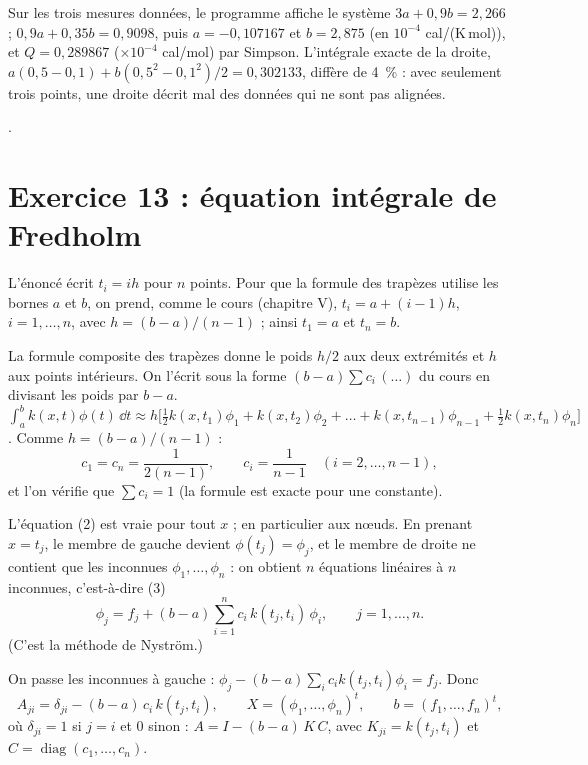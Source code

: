 \Verif Sur les trois mesures données, le programme affiche le système
$3a + 0{,}9b = 2{,}266$ ; $0{,}9a + 0{,}35b = 0{,}9098$, puis
$a = -0{,}107167$ et $b = 2{,}875$ (en $10^{-4}$ cal/(K\,mol)), et
$Q = 0{,}289867$ ($\times 10^{-4}$ cal/mol) par Simpson. L'intégrale exacte de la
droite, $a(0{,}5 - 0{,}1) + b(0{,}5^2 - 0{,}1^2)/2 = 0{,}302133$, diffère de 4~\% :
avec seulement trois points, une droite décrit mal des données qui ne sont pas
alignées.

\Refs {}.

\section{Exercice 13 : équation intégrale de Fredholm}

\Attention L'énoncé écrit $t_i = ih$ pour $n$ points. Pour que la formule des
trapèzes utilise les bornes $a$ et $b$, on prend, comme le cours (chapitre V),
$t_i = a + (i-1)h$, $i = 1, \dots, n$, avec $h = (b-a)/(n-1)$ ; ainsi
$t_1 = a$ et $t_n = b$.

\Pourquoi La formule composite des trapèzes donne le poids $h/2$ aux deux
extrémités et $h$ aux points intérieurs. On l'écrit sous la forme
$(b-a)\sum c_i\,(\dots)$ du cours en divisant les poids par $b - a$.
\Etapes
{} $\int_a^b k(x,t)\phi(t)\,\dd t \approx h\bigl[\tfrac12k(x,t_1)\phi_1
  + k(x,t_2)\phi_2 + \dots + k(x,t_{n-1})\phi_{n-1} + \tfrac12k(x,t_n)\phi_n\bigr]$.
 Comme $h = (b-a)/(n-1)$ :
\[
  c_1 = c_n = \frac{1}{2(n-1)}, \qquad c_i = \frac{1}{n-1} \quad (i = 2, \dots, n-1),
\]
et l'on vérifie que $\sum c_i = 1$ (la formule est exacte pour une constante).

\Pourquoi L'équation (2) est vraie pour tout $x$ ; en particulier aux nœuds.
En prenant $x = t_j$, le membre de gauche devient $\phi(t_j) = \phi_j$, et le
membre de droite ne contient que les inconnues $\phi_1, \dots, \phi_n$ : on
obtient $n$ équations linéaires à $n$ inconnues, c'est-à-dire (3)
\[
  \phi_j = f_j + (b-a)\sum_{i=1}^{n}c_i\,k(t_j, t_i)\,\phi_i, \qquad j = 1, \dots, n .
\]
(C'est la méthode de Nyström.)

On passe les inconnues à gauche :
$\phi_j - (b-a)\sum_i c_ik(t_j,t_i)\phi_i = f_j$. Donc
\[
  A_{ji} = \delta_{ji} - (b-a)\,c_i\,k(t_j, t_i), \qquad
  X = (\phi_1, \dots, \phi_n)^{t}, \qquad b = (f_1, \dots, f_n)^{t},
\]
où $\delta_{ji} = 1$ si $j = i$ et $0$ sinon : $A = I - (b-a)\,K\,C$, avec
$K_{ji} = k(t_j, t_i)$ et $C = \operatorname{diag}(c_1, \dots, c_n)$.

